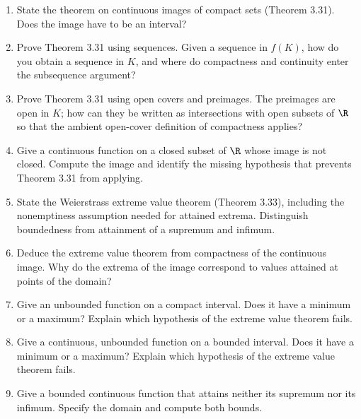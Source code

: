 \begin{enumerate}[resume]
  \item State the theorem on continuous images of compact sets
    (Theorem 3.31). Does the image have to be an interval?

  \item Prove Theorem 3.31 using sequences. Given a sequence in
    \(f(K)\), how do you obtain a sequence in \(K\), and where do
    compactness and continuity enter the subsequence argument?

  \item Prove Theorem 3.31 using open covers and preimages.
    The preimages are open in \(K\); how can they be written as
    intersections with open subsets of \(\R\) so that the ambient
    open-cover definition of compactness applies?

  \item Give a continuous function on a closed subset of \(\R\)
    whose image is not closed. Compute the image and identify the
    missing hypothesis that prevents Theorem 3.31 from applying.

  \item State the Weierstrass extreme value theorem (Theorem 3.33),
    including the nonemptiness assumption needed for attained extrema.
    Distinguish boundedness from attainment of a supremum and infimum.

  \item Deduce the extreme value theorem from compactness of the
    continuous image. Why do the extrema of the image correspond
    to values attained at points of the domain?

  \item Give an unbounded function on a compact interval. Does it
    have a minimum or a maximum? Explain which hypothesis of the
    extreme value theorem fails.

  \item Give a continuous, unbounded function on a bounded interval.
    Does it have a minimum or a maximum? Explain which hypothesis
    of the extreme value theorem fails.

  \item Give a bounded continuous function that attains neither its
    supremum nor its infimum. Specify the domain and compute both bounds.


\end{enumerate}

